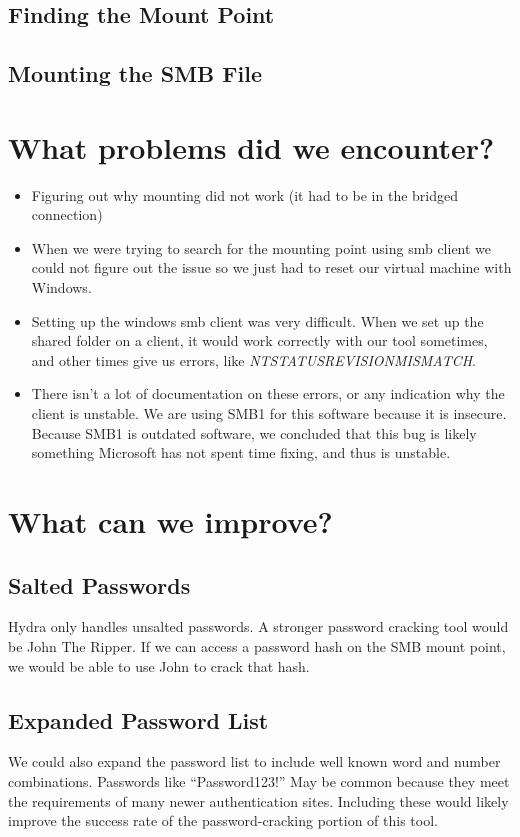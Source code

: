\documentclass[a4paper]{article}
\begin{document}
\subsection{Finding the Mount Point}

\subsection{Mounting the SMB File}

\section{What problems did we encounter?}
\begin{itemize}
\item Figuring out why mounting did not work (it had to be in the bridged connection)
\item When we were trying to search for the mounting point using smb client we could not figure out the issue so we just had to reset our virtual machine with Windows.
\item Setting up the windows smb client was very difficult. When we set up the shared folder on a client, it would work correctly with our tool sometimes, and other times give us errors, like \textit{NT\textunderscore STATUS\textunderscore REVISION\textunderscore MISMATCH}.
\item  There isn’t a lot of documentation on these errors, or any indication why the client is unstable. We are using SMB1 for this software because it is insecure. Because SMB1 is outdated software, we concluded that this bug is likely something Microsoft has not spent time fixing, and thus is unstable. 
\end{itemize}

\section{What can we improve?}
\subsection{Salted Passwords}
Hydra only handles unsalted passwords. A stronger password cracking tool would be John The Ripper. If we can access a password hash on the SMB mount point, we would be able to use John to crack that hash.

\subsection{Expanded Password List}
We could also expand the password list to include well known word and number combinations. Passwords like “Password123!” May be common because they meet the requirements of many newer authentication sites. Including these would likely improve the success rate of the password-cracking portion of this tool. 
\end{document}
